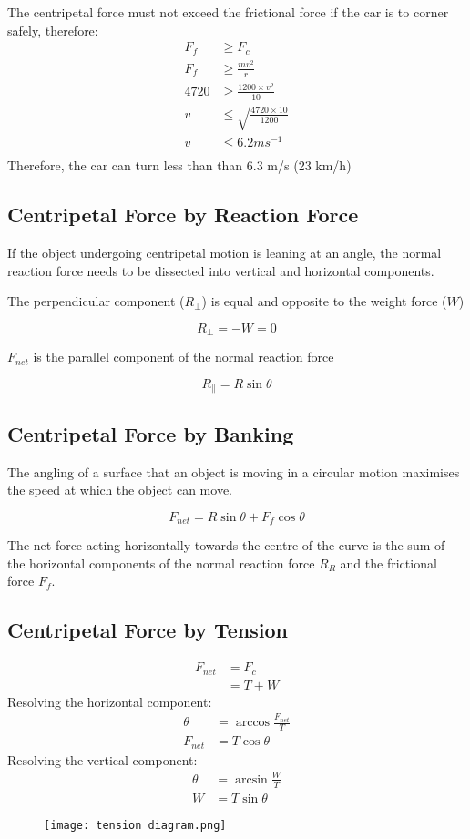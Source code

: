		The centripetal force must not exceed the frictional force if the car is to corner safely, therefore:
		\begin{align*}
			F_f &\ge F_c \\
			F_f &\ge \frac{mv^2}{r} \\
			4720 &\ge \frac{1200 \times v^2}{10} \\
			v &\le \sqrt{\frac{4720 \times 10}{1200}} \\
			v &\le 6.2ms^{-1} \\
		\end{align*}
		Therefore, the car can turn less than than 6.3 m/s (23 km/h)

	\subsection{Centripetal Force by Reaction Force}
		If the object undergoing centripetal motion is leaning at an angle, the normal reaction force needs to be dissected into vertical and horizontal components.

		The perpendicular component ($R_{\perp}$) is equal and opposite to the weight force ($W$)

		$$R_{\perp} = -W = 0$$

		$F_{net}$ is the parallel component of the normal reaction force

		$$R_{\parallel} = R \sin{\theta}$$
	
	\subsection{Centripetal Force by Banking}
		The angling of a surface that an object is moving in a circular motion maximises the speed at which the object can move.

		$$F_{net} = R\sin{\theta} + F_{f}\cos{\theta}$$

		The net force acting horizontally towards the centre of the curve is the sum of the horizontal components of the normal reaction force $R_R$ and the frictional force $F_f$.

	\subsection{Centripetal Force by Tension}
		\begin{align*}
			F_{net} &= F_c \\
			&= T + W
		\end{align*}
		Resolving the horizontal component:
		\begin{align*}
			\theta &= \arccos{\frac{F_{net}}{T}} \\
			F_{net} &= T\cos{\theta}
		\end{align*}
		Resolving the vertical component:
		\begin{align*}
			\theta &= \arcsin{\frac{W}{T}} \\
			W &= T\sin{\theta}
		\end{align*}
		\begin{figure}
			\centering
			\texttt{[image: tension diagram.png]}
		\end{figure}


